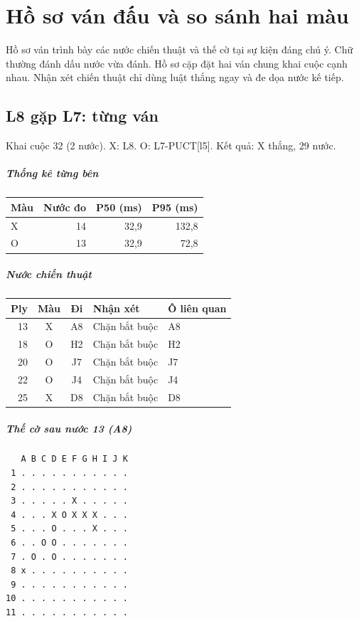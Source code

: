 \chapter{Hồ sơ ván đấu và so sánh hai màu}
Hồ sơ ván trình bày các nước chiến thuật và thế cờ tại sự kiện đáng chú ý. Chữ thường đánh dấu nước vừa đánh. Hồ sơ cặp đặt hai ván chung khai cuộc cạnh nhau. Nhận xét chiến thuật chỉ dùng luật thắng ngay và đe dọa nước kế tiếp.
\section{L8 gặp L7: từng ván}
Khai cuộc 32 (2 nước). X: L8. O: L7-PUCT[l5]. Kết quả: X thắng, 29 nước.
\paragraph{Thống kê từng bên}
\begin{center}\small
\begin{tabular}{@{}lrrr@{}}
\toprule
Màu & Nước đo & P50 (ms) & P95 (ms) \\
\midrule
X & 14 & 32,9 & 132,8 \\
O & 13 & 32,9 & 72,8 \\
\bottomrule
\end{tabular}
\end{center}
\paragraph{Nước chiến thuật}
\begin{center}\small
\begin{tabular}{@{}rccll@{}}
\toprule
Ply & Màu & Đi & Nhận xét & Ô liên quan \\
\midrule
13 & X & A8 & Chặn bắt buộc & A8 \\
18 & O & H2 & Chặn bắt buộc & H2 \\
20 & O & J7 & Chặn bắt buộc & J7 \\
22 & O & J4 & Chặn bắt buộc & J4 \\
25 & X & D8 & Chặn bắt buộc & D8 \\
\bottomrule
\end{tabular}
\end{center}
\paragraph{Thế cờ sau nước 13 (A8)}
\begin{verbatim}
   A B C D E F G H I J K
 1 . . . . . . . . . . .
 2 . . . . . . . . . . .
 3 . . . . . X . . . . .
 4 . . . X O X X X . . .
 5 . . . O . . . X . . .
 6 . . O O . . . . . . .
 7 . O . O . . . . . . .
 8 x . . . . . . . . . .
 9 . . . . . . . . . . .
10 . . . . . . . . . . .
11 . . . . . . . . . . .
\end{verbatim}
